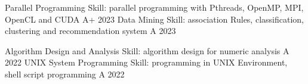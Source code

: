 

\begin{cvhonors}

        \cvhonor
            {Parallel Programming} %
            {Skill: parallel programming with Pthreads, OpenMP, MPI, OpenCL and CUDA} %
            {A+} %
            {2023} %
        \cvhonor
            {Data Mining} %
            {Skill: association Rules, classification, clustering and recommendation system} %
            {A} %
            {2023} %
    
        \cvhonor
            {Algorithm Design and Analysis} %
            {Skill: algorithm design for numeric analysis} %
            {A} %
            {2022} %
        \cvhonor
            {UNIX System Programming} %
            {Skill: programming in UNIX Environment, shell script programming} %
            {A} %
            {2022} %
\end{cvhonors}


